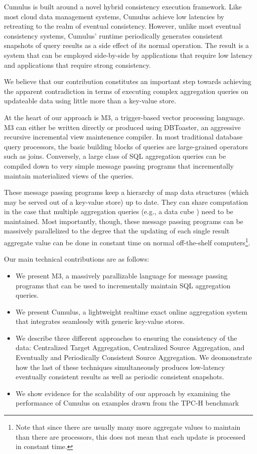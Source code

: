 \documentclass{vldb}
\begin{document}
Cumulus is built around a novel hybrid consistency execution framework.  Like most cloud data management systems, Cumulus achieve low latencies by retreating to the realm of eventual consistency.  However, unlike most eventual consistency systems, Cumulus' runtime periodically generates consistent snapshots of query results as a side effect of its normal operation.  The result is a system that can be employed side-by-side by applications that require low latency and applications that require strong consistency.

We believe that our contribution constitutes an important step towards achieving the apparent contradiction in terms of executing complex aggregation queries on updateable data using little more than a key-value store.

At the heart of our approach is M3, a trigger-based vector processing language.  M3 can either be written directly or produced using DBToaster\cite{1687592}, an aggressive recursive incremental view maintenence compiler.  In most traditional database query processors, the basic building blocks of queries are large-grained operators such as joins.  Conversely, a large class of SQL aggregation queries can be compiled down to very simple message passing programs that incrementally maintain materialized views of the queries.

These message passing programs keep a hierarchy of map data structures (which may be served out of a key-value store) up to date. They can share computation in the case that multiple aggregation queries (e.g., a data cube \cite{datacube}) need to be maintained.  Most importantly, though, these message passing programs can be massively parallelized to the degree that the updating of each single result aggregate value can be done in constant time on normal off-the-shelf computers\footnote{Note that since there are
usually many more aggregate values to maintain than there are processors,
this does not mean that each update is processed in constant time.}.

Our main technical contributions are as follows:
\begin{itemize}
\item We present M3, a massively parallizable language for message passing programs that can be used to incrementally maintain SQL aggregation queries.
\item We present Cumulus, a lightweight realtime exact online aggregation system that integrates seamlessly with generic key-value stores. 
\item We describe three different approaches to ensuring the consistency of the data: Centralized Target Aggregation, Centralized Source Aggregation, and Eventually and Periodically Consistent Source Aggregation.  We deomonstrate how the last of these techniques simultaneously produces low-latency eventually consistent results as well as periodic consistent snapshots.
\item We show evidence for the scalability of our approach by examining the performance of Cumulus on examples drawn from the TPC-H benchmark\cite{tpch2008}
\end{itemize}
\end{document}
